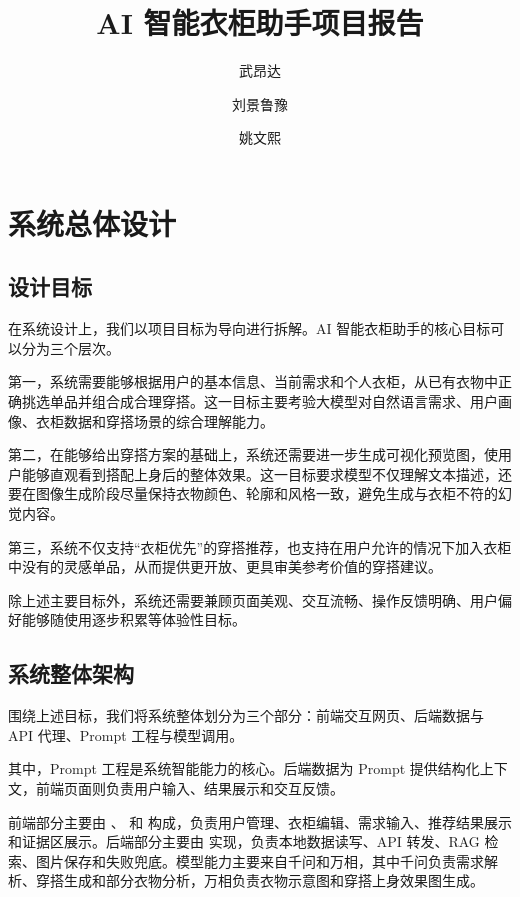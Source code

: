 \documentclass{applemlr}
\title{AI 智能衣柜助手项目报告}
\author{武昂达}
\author{刘景鲁豫}
\author{姚文熙}
\affiliation{上海交通大学自动化与感知学院}
\begin{document}
\maketitle

\tableofcontents
\newpage

\section{系统总体设计}
\label{sec:system-design}

\subsection{设计目标}

在系统设计上，我们以项目目标为导向进行拆解。AI 智能衣柜助手的核心目标可以分为三个层次。

第一，系统需要能够根据用户的基本信息、当前需求和个人衣柜，从已有衣物中正确挑选单品并组合成合理穿搭。这一目标主要考验大模型对自然语言需求、用户画像、衣柜数据和穿搭场景的综合理解能力。

第二，在能够给出穿搭方案的基础上，系统还需要进一步生成可视化预览图，使用户能够直观看到搭配上身后的整体效果。这一目标要求模型不仅理解文本描述，还要在图像生成阶段尽量保持衣物颜色、轮廓和风格一致，避免生成与衣柜不符的幻觉内容。

第三，系统不仅支持``衣柜优先''的穿搭推荐，也支持在用户允许的情况下加入衣柜中没有的灵感单品，从而提供更开放、更具审美参考价值的穿搭建议。

除上述主要目标外，系统还需要兼顾页面美观、交互流畅、操作反馈明确、用户偏好能够随使用逐步积累等体验性目标。

\subsection{系统整体架构}

围绕上述目标，我们将系统整体划分为三个部分：前端交互网页、后端数据与 API 代理、Prompt 工程与模型调用。

其中，Prompt 工程是系统智能能力的核心。后端数据为 Prompt 提供结构化上下文，前端页面则负责用户输入、结果展示和交互反馈。

前端部分主要由 、 和  构成，负责用户管理、衣柜编辑、需求输入、推荐结果展示和证据区展示。后端部分主要由  实现，负责本地数据读写、API 转发、RAG 检索、图片保存和失败兜底。模型能力主要来自千问和万相，其中千问负责需求解析、穿搭生成和部分衣物分析，万相负责衣物示意图和穿搭上身效果图生成。
\end{document}
